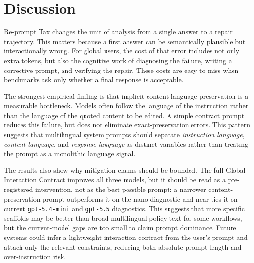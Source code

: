 \section{Discussion}

Re-prompt Tax changes the unit of analysis from a single answer to a repair
trajectory. This matters because a first answer can be semantically plausible
but interactionally wrong. For global users, the cost of that error includes
not only extra tokens, but also the cognitive work of diagnosing the failure,
writing a corrective prompt, and verifying the repair. These costs are easy to
miss when benchmarks ask only whether a final response is acceptable.

The strongest empirical finding is that implicit content-language preservation
is a measurable bottleneck. Models often follow the language of the instruction
rather than the language of the quoted content to be edited. A simple contract
prompt reduces this failure, but does not eliminate exact-preservation errors.
This pattern suggests that multilingual system prompts should separate
\emph{instruction language}, \emph{content language}, and \emph{response
language} as distinct variables rather than treating the prompt as a monolithic
language signal.

The results also show why mitigation claims should be bounded. The full Global
Interaction Contract improves all three models, but it should be read as a
pre-registered intervention, not as the best possible prompt: a narrower
content-preservation prompt outperforms it on the nano diagnostic and near-ties
it on current \texttt{gpt-5.4-mini} and \texttt{gpt-5.5} diagnostics. This
suggests that more specific scaffolds may be better than broad multilingual
policy text for some workflows, but the current-model gaps are too small to
claim prompt dominance. Future systems could infer a lightweight interaction
contract from the user's prompt and attach only the relevant constraints,
reducing both absolute prompt length and over-instruction risk.
